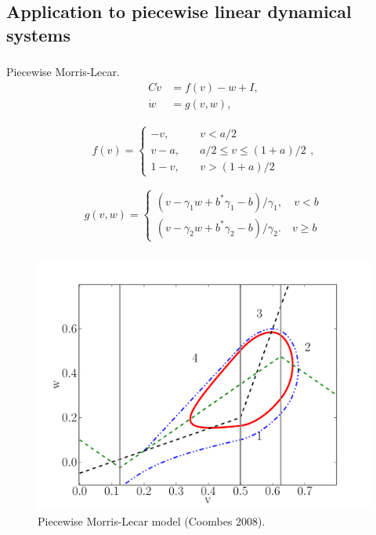 \documentclass{beamer}
\begin{document}
\subsection{Application to piecewise linear dynamical systems}

\begin{frame}
\frametitle{\insertsection}
\framesubtitle{\insertsubsection}
Piecewise Morris-Lecar.
\begin{equation}
 \begin{split}
  C \dot{v} &= f(v) - w + I,\\
  \dot{w} &= g(v,w),
 \end{split}
\label{eq:coombes-eqs}\end{equation}

 \begin{equation}
 \begin{split}
  f(v) = \left \{ \begin{array}{ll} -v,& \quad v< a/2  \\ v - a, & \quad a/2 \leq v \leq (1+a)/2 \\ 1- v, & \quad v >(1+a)/2 \end{array} \right . ,
 \end{split}
\end{equation}

 \begin{displaymath}
   g(v,w) = \left\{
     \begin{array}{lr}
       (v-\gamma_1w+b^*\gamma_1-b)/\gamma_1, \quad v < b\\
       (v-\gamma_2w+b^* \gamma_2-b)/\gamma_2. \quad v \geq b
     \end{array}
   \right.
\end{displaymath}
\end{frame}


\begin{frame}
\begin{figure}
\frametitle{\insertsection}
  \framesubtitle{\insertsubsection}
 \includegraphics[width=.8\textwidth]{pml_fig.pdf}
 \caption{Piecewise Morris-Lecar model (Coombes 2008).}
\end{figure}
\end{frame}
\end{document}
